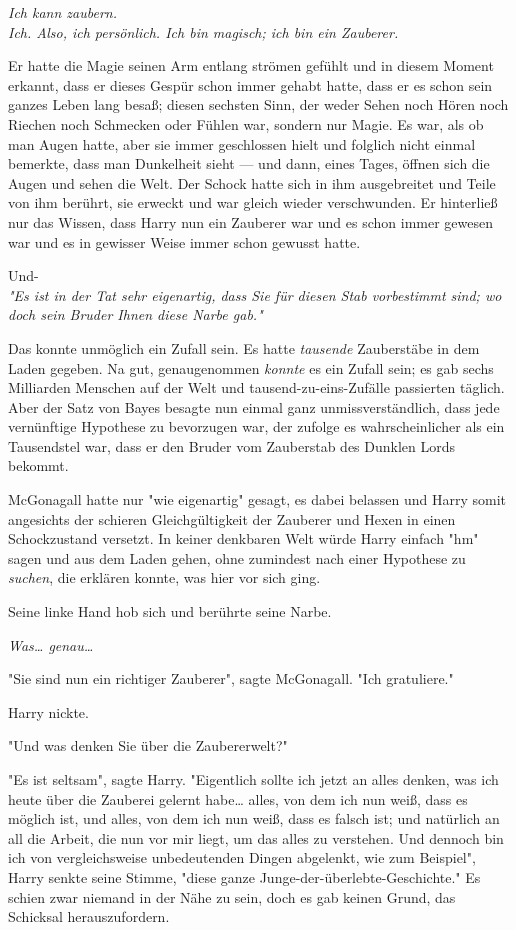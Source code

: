{\emph{Ich kann zaubern.}\\ \emph{Ich. Also, ich persönlich. Ich bin magisch; ich bin ein Zauberer.}

Er hatte die Magie seinen Arm entlang strömen gefühlt und in diesem Moment erkannt, dass er dieses Gespür schon immer gehabt hatte, dass er es schon sein ganzes Leben lang besaß; diesen sechsten Sinn, der weder Sehen noch Hören noch Riechen noch Schmecken oder Fühlen war, sondern nur Magie. Es war, als ob man Augen hatte, aber sie immer geschlossen hielt und folglich nicht einmal bemerkte, dass man Dunkelheit sieht --- und dann, eines Tages, öffnen sich die Augen und sehen die Welt. Der Schock hatte sich in ihm ausgebreitet und Teile von ihm berührt, sie erweckt und war gleich wieder verschwunden. Er hinterließ nur das Wissen, dass Harry nun ein Zauberer war und es schon immer gewesen war und es in gewisser Weise immer schon gewusst hatte.

Und-\\ \emph{"Es ist in der Tat sehr eigenartig, dass Sie für diesen Stab vorbestimmt sind; wo doch sein Bruder Ihnen diese Narbe gab."}

Das konnte unmöglich ein Zufall sein. Es hatte \emph{tausende} Zauberstäbe in dem Laden gegeben. Na gut, genaugenommen \emph{konnte} es ein Zufall sein; es gab sechs Milliarden Menschen auf der Welt und tausend-zu-eins-Zufälle passierten täglich. Aber der Satz von Bayes besagte nun einmal ganz unmissverständlich, dass jede vernünftige Hypothese zu bevorzugen war, der zufolge es wahrscheinlicher als ein Tausendstel war, dass er den Bruder vom Zauberstab des Dunklen Lords bekommt.

McGonagall hatte nur "wie eigenartig" gesagt, es dabei belassen und Harry somit angesichts der schieren Gleichgültigkeit der Zauberer und Hexen in einen Schockzustand versetzt. In keiner denkbaren Welt würde Harry einfach "hm" sagen und aus dem Laden gehen, ohne zumindest nach einer Hypothese zu \emph{suchen}, die erklären konnte, was hier vor sich ging.

Seine linke Hand hob sich und berührte seine Narbe.

\emph{Was… genau…}

"Sie sind nun ein richtiger Zauberer", sagte McGonagall. "Ich gratuliere."

Harry nickte.

"Und was denken Sie über die Zaubererwelt?"

"Es ist seltsam", sagte Harry. "Eigentlich sollte ich jetzt an alles denken, was ich heute über die Zauberei gelernt habe… alles, von dem ich nun weiß, dass es möglich ist, und alles, von dem ich nun weiß, dass es falsch ist; und natürlich an all die Arbeit, die nun vor mir liegt, um das alles zu verstehen. Und dennoch bin ich von vergleichsweise unbedeutenden Dingen abgelenkt, wie zum Beispiel", Harry senkte seine Stimme, "diese ganze Junge-der-überlebte-Geschichte." Es schien zwar niemand in der Nähe zu sein, doch es gab keinen Grund, das Schicksal herauszufordern.

}
